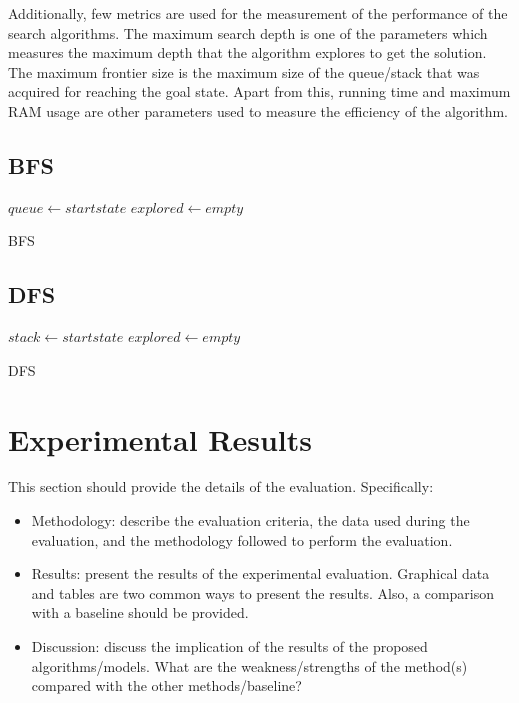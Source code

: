 \documentclass{svproc}
\begin{document}
Additionally, few metrics are used for the measurement of the performance of the search algorithms. The maximum search depth is one of the parameters which measures the maximum depth that the algorithm explores to get the solution. The maximum frontier size is the maximum size of the queue/stack that was acquired for reaching the goal state. Apart from this, running time and maximum RAM usage are other parameters used to measure the efficiency of the algorithm. \\

\subsection{BFS}

\begin{algorithm}[H]
	\SetAlgoLined
	 $queue \gets start state$\;
	 $explored \gets empty$\;
	\caption{BFS}
\end{algorithm}

\subsection{DFS}

\begin{algorithm}[H]
	\SetAlgoLined
	$stack \gets start state$\;
	$explored \gets empty$\;
	\caption{DFS}
\end{algorithm}

\section{Experimental Results}
This section should provide the details of the evaluation. Specifically:
\begin{itemize}
\item Methodology: describe the evaluation criteria, the data used during the evaluation, and the methodology followed to perform the evaluation. 
\item Results: present the results of the experimental evaluation. Graphical data and tables are two common ways to present the results. Also, a comparison with a baseline should be provided.
\item Discussion: discuss the implication of the results of the proposed algorithms/models. What are the weakness/strengths of the method(s) compared with the other methods/baseline?
\end{itemize}
\end{document}
